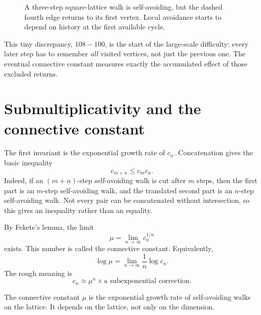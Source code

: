 \begin{figure}[H]
\centering
{}
\caption{A three-step square-lattice walk is self-avoiding, but the dashed fourth edge returns to its first vertex. Local avoidance starts to depend on history at the first available cycle.}
\end{figure}

This tiny discrepancy, $108-100$, is the start of the large-scale difficulty: every later step has to remember \emph{all} visited vertices, not just the previous one. The eventual connective constant measures exactly the accumulated effect of those excluded returns.

\section{Submultiplicativity and the connective constant}

The first invariant is the exponential growth rate of \(c_n\).  Concatenation gives the basic inequality
\[
  c_{m+n}\le c_m c_n.
\]
Indeed, if an \((m+n)\)-step self-avoiding walk is cut after \(m\) steps, then the first part is an \(m\)-step self-avoiding walk, and the translated second part is an \(n\)-step self-avoiding walk.  Not every pair can be concatenated without intersection, so this gives an inequality rather than an equality.

By Fekete's lemma, the limit
\[
  \mu=\lim_{n\to\infty} c_n^{1/n}
\]
exists.  This number is called the connective constant.  Equivalently,
\[
  \log \mu=\lim_{n\to\infty} \frac{1}{n}\log c_n.
\]
The rough meaning is
\[
  c_n\approx \mu^n\times \text{a subexponential correction}.
\]

\begin{definition}
The connective constant \(\mu\) is the exponential growth rate of self-avoiding walks on the lattice.  It depends on the lattice, not only on the dimension.
\end{definition}

